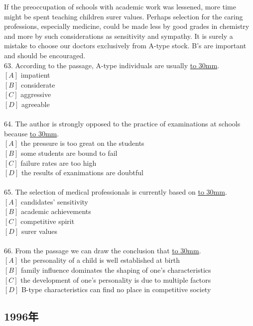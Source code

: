 \documentclass[a4paper]{article}
\begin{document}
\par
If the preoccupation of schools with academic work was lessened, more time might be spent teaching children surer values. Perhaps selection for the caring professions, especially medicine, could be made less by good grades in chemistry and more by such considerations as sensitivity and sympathy. It is surely a mistake to choose our doctors exclusively from A-type stock. B’s are important and should be encouraged.
\\63.	According to the passage, A-type individuals are usually \underline{\hbox to 30mm{}}.\\$[A]$ impatient\\$[B]$ considerate\\$[C]$ aggressive\\$[D]$ agreeable\\\\64.	The author is strongly opposed to the practice of examinations at schools because \underline{\hbox to 30mm{}}.\\$[A]$ the pressure is too great on the students\\$[B]$ some students are bound to fail\\$[C]$ failure rates are too high\\$[D]$ the results of exanimations are doubtful\\\\65.	The selection of medical professionals is currently based on \underline{\hbox to 30mm{}}.\\$[A]$ candidates’ sensitivity\\$[B]$ academic achievements\\$[C]$ competitive spirit\\$[D]$ surer values\\\\66.	From the passage we can draw the conclusion that \underline{\hbox to 30mm{}}.\\$[A]$ the personality of a child is well established at birth\\$[B]$ family influence dominates the shaping of one’s characteristics\\$[C]$ the development of one’s personality is due to multiple factors\\$[D]$ B-type characteristics can find no place in competitive society\\\subsection{1996年}
\end{document}
